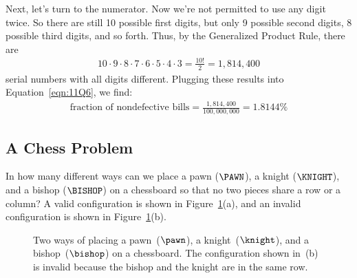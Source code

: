 Next, let's turn to the numerator.  Now we're not permitted to use any
digit twice.  So there are still 10 possible first digits, but only 9
possible second digits, 8 possible third digits, and so forth.  Thus, by
the Generalized Product Rule, there are
%
\begin{align*}
10 \cdot 9 \cdot 8 \cdot 7 \cdot 6 \cdot 5 \cdot 4 \cdot 3
     = \frac{10!}{2} %
     = 1{,}814{,}400
\end{align*}
%
serial numbers with all digits different.  Plugging these results into
Equation~\ref{eqn:11Q6}, we find:
%
\begin{align*}
\text{fraction of nondefective bills}
     = \frac{1{,}814{,}400}{100{,}000{,}000} %
     = 1.8144\%
\end{align*}

\subsection{A Chess Problem}

In how many different ways can we place a pawn ($\PAWN$), a knight
($\KNIGHT$), and a bishop ($\BISHOP$) on a chessboard so that no two
pieces share a row or a column?  A valid configuration is shown in
Figure~\ref{fig:11Q7}(a), and an invalid configuration is shown in
Figure~\ref{fig:11Q7}(b).

\begin{figure}\normalbaselines

\subfloat[valid]{\chessboard[setpieces={bb4, ne7, pf2}]}
\subfloat[invalid]{\chessboard[setpieces={bc3, pe6, nf3}]}

\caption{Two ways of placing a pawn~($\pawn$), a knight~($\knight$),
  and a bishop~($\bishop$) on a chessboard.  The configuration shown
  in~(b) is invalid because the bishop and the knight are in the same
  row.}

\label{fig:11Q7}

\end{figure}

